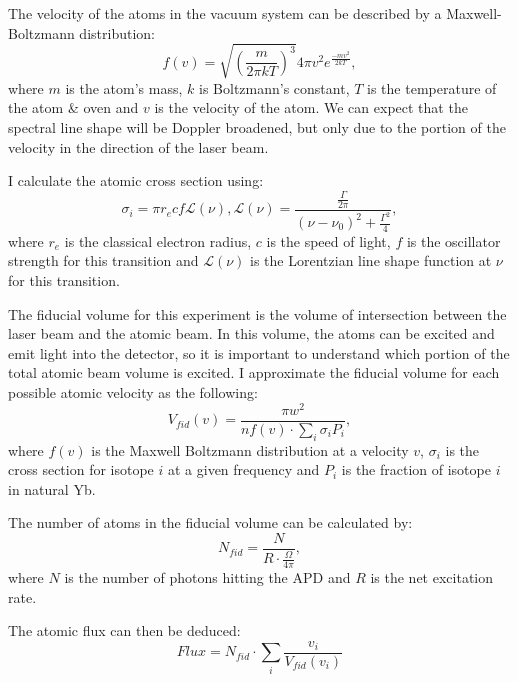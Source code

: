\documentclass[12pt, a4paper]{article}
\begin{document}
The velocity of the atoms in the vacuum system can be described by a Maxwell-Boltzmann distribution:
\begin{equation}
f(v) = \sqrt{(\frac{m}{2\pi k T})^3}4\pi v^2 e^{\frac{-mv^2}{2kT}},
\end{equation}
where $m$ is the atom's mass, $k$ is Boltzmann's constant, $T$ is the temperature of the atom \& oven and $v$ is the velocity of the atom. We can expect that the spectral line shape will be Doppler broadened, but only due to the portion of the velocity in the direction of the laser beam.

I calculate the atomic cross section  using:
\begin{equation}
\sigma_i = \pi r_e c f \mathscr{L}(\nu),
\mathscr{L}(\nu) = \frac{\frac{\Gamma}{2\pi}}{(\nu-\nu_0)^2+\frac{\Gamma^2}{4}},
\end{equation}
where $r_e$ is the classical electron radius, $c$ is the speed of light, $f$ is the oscillator strength for this transition and $\mathscr{L}(\nu)$ is the Lorentzian line shape function at $\nu$ for this transition.

The fiducial volume for this experiment is the volume of intersection between the laser beam and the atomic beam. In this volume, the atoms can be excited and emit light into the detector, so it is important to understand which portion of the total atomic beam volume is excited. I approximate the fiducial volume for each possible atomic velocity as the following:
\begin{equation}
V_{fid}(v) = \frac{\pi w^2}{n f(v) \cdot \sum\limits_{i} \sigma_i P_i},
\end{equation}
where $f(v)$ is the Maxwell Boltzmann distribution at a velocity $v$, $\sigma_i$ is the cross section for isotope $i$ at a given frequency and $P_i$ is the fraction of isotope $i$ in natural Yb.

The number of atoms in the fiducial volume can be calculated by:
\begin{equation}
N_{fid} = \frac{N}{R \cdot \frac{\Omega}{4\pi}},
\end{equation}
where $N$ is the number of photons hitting the APD and $R$ is the net excitation rate.

The atomic flux can then be deduced:
\begin{equation}
Flux = N_{fid}\cdot \sum\limits_i \frac{v_i}{V_{fid}(v_i)}
\end{equation}
\end{document}
